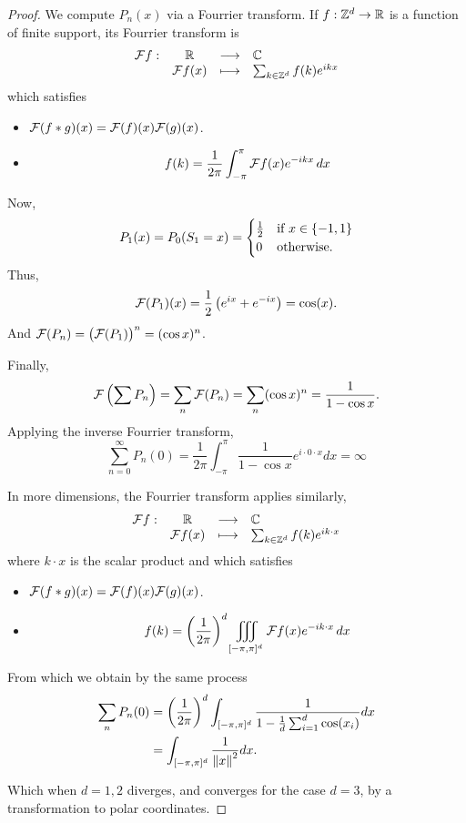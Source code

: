     \begin{proof}
        We compute $P_n(x)$ via a Fourrier transform.
        If $f: \mathbb Z^d \to \mathbb R$ is a function of finite support,
        its Fourrier transform is
        \[
            \begin{array}{rccl} \mathcal F f : & \mathbb R & \longrightarrow & \mathbb C \\ & \mathcal F f(x) & \longmapsto & 
                \sum_{k \in \mathbb Z^d} f(k) e^{ikx}
             \end{array}
        \]
        which satisfies \begin{itemize}
            \item $\mathcal F(f * g)(x) = \mathcal F(f)(x) \mathcal F(g)(x)$.
            \item \[
                f(k) = \frac{1}{2\pi} \int_{-\pi}^\pi \mathcal F f(x) e^{-ikx} \, dx
            \]
        \end{itemize}

        Now, \[
            P_1(x) = P_0(S_1 = x) = \begin{cases}
                \frac{1}{2} & \text{if } x \in \left\{ -1, 1 \right\} \\
                0 & \text{otherwise}.
            \end{cases}
        \]
        Thus,
        \[
            \mathcal F(P_1)(x) = \frac{1}{2}\left(e^{ix} + e^{-ix}\right) = \cos(x).
        \]
        And $ \mathcal F(P_n) = \big(\mathcal F(P_1)\big)^n = (\cos x)^n$.

        Finally, 
        \[
            \mathcal F\left(\sum P_n\right) = \sum_n \mathcal F(P_n) = 
            \sum_n (\cos x)^n = \frac{1}{1 - \cos x}.
        \]
        Applying the inverse Fourrier transform,
        \[
            \sum_{n = 0}^\infty P_n(0) = \frac{1}{2\pi} \int_{-\pi}^{\pi}
            \frac{1}{1 - \cos x} e^{i \cdot 0 \cdot x} dx = \infty
        \]

        In more dimensions, the Fourrier transform applies similarly,
        \[
            \begin{array}{rccl} \mathcal F f : & \mathbb R & \longrightarrow & \mathbb C \\ & \mathcal F f(x) & \longmapsto & 
                \sum_{k \in \mathbb Z^d} f(k) e^{ik \cdot x}
             \end{array}
        \]
        where $k \cdot x$ is the scalar product and which satisfies \begin{itemize}
            \item $\mathcal F(f * g)(x) = \mathcal F(f)(x) \mathcal F(g)(x)$.
            \item \[
                f(k) = \left(\frac{1}{2\pi}\right)^d
                 \iiint_{[-\pi, \pi]^d} \mathcal F f(x) e^{-ik \cdot x} \, dx
            \]
        \end{itemize}

        From which we obtain by the same process 
        \begin{align*}
            \sum_n P_n(0) &= 
                \left(\frac{1}{2\pi}\right)^d
                \int_{[-\pi, \pi]^d} 
                \frac{1}{1 - \frac{1}{d} \sum_{i = 1}^d \cos(x_i)} dx
            \\&= 
                \int_{[-\pi, \pi]^d} 
                \frac{1}{\left\| x \right\|^2} dx.
        \end{align*}

        Which when $d = 1, 2$ diverges, and converges for the case $d = 3$, 
        by a transformation to polar coordinates.
    \end{proof}

